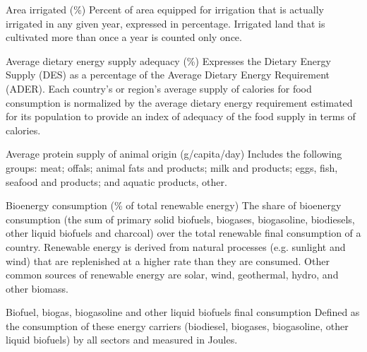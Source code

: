 \begin{MetadataCollection} {}
\begin{metadata}{Area irrigated (\%)} {}
Percent of area equipped for irrigation that is actually irrigated in any given year, expressed in percentage. Irrigated land that is cultivated more than once a year is counted only once.
\end{metadata}

\begin{metadata}{Average dietary energy supply adequacy (\%)} {}
Expresses the Dietary Energy Supply (DES) as a percentage of the Average Dietary Energy Requirement (ADER). Each country's or region's average supply of calories for food consumption is normalized by the average dietary energy requirement estimated for its population to provide an index of adequacy of the food supply in terms of calories.
\end{metadata}

\begin{metadata}{Average protein supply of animal origin (g/capita/day)} {}
Includes the following groups: meat; offals; animal fats and products; milk and products; eggs, fish, seafood and products; and aquatic products, other. 
\end{metadata}

\begin{metadata}{Bioenergy consumption (\% of total renewable energy)} {}
The share of bioenergy consumption (the sum of primary solid biofuels, biogases, biogasoline, biodiesels, other liquid biofuels and charcoal) over the total renewable final consumption of a country. Renewable energy is derived from natural processes (e.g. sunlight and wind) that are replenished at a higher rate than they are consumed. Other common sources of renewable energy are solar, wind, geothermal, hydro, and other biomass.
\end{metadata}

\begin{metadata}{Biofuel, biogas, biogasoline and other liquid biofuels final consumption} {}
Defined as the consumption of these energy carriers (biodiesel, biogases, biogasoline, other liquid biofuels) by all sectors and measured in Joules.
\end{metadata}


\end{MetadataCollection}
